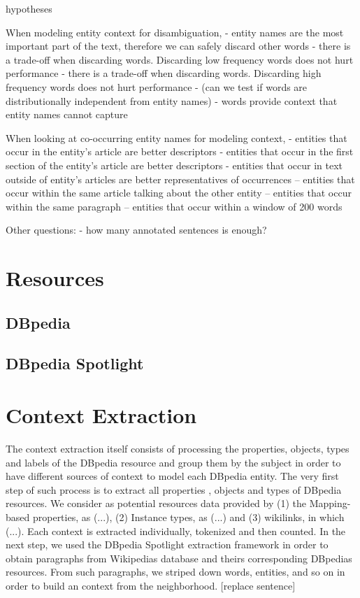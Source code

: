 \documentclass[10pt,a4paper]{article}
\begin{document}
hypotheses

When modeling entity context for disambiguation,
- entity names are the most important part of the text, therefore we can safely discard other words 
- there is a trade-off when discarding words. Discarding low frequency words does not hurt performance
- there is a trade-off when discarding words. Discarding high frequency words does not hurt performance
- (can we test if words are distributionally independent from entity names)
- words provide context that entity names cannot capture

When looking at co-occurring entity names for modeling context,
- entities that occur in the entity's article are better descriptors
- entities that occur in the first section of the entity's article are better descriptors
- entities that occur in text outside of entity's articles are better representatives of occurrences
-- entities that occur within the same article talking about the other entity
-- entities that occur within the same paragraph
-- entities that occur within a window of 200 words

Other questions:
- how many annotated sentences is enough?

\section{Resources}
\subsection{DBpedia}
\subsection{DBpedia Spotlight}
\section{Context Extraction}
The context extraction itself consists of processing the properties, objects, types and labels of the DBpedia resource and group them by the subject in order to have  different sources of context to model each DBpedia entity.
The very first step of such process is to extract all properties , objects and types of DBpedia resources. We consider as potential resources data provided by (1) the Mapping-based properties, as (...), (2) Instance types, as (...) and (3) wikilinks, in which (...). Each context is extracted individually, tokenized and then counted. In the next step, we used the DBpedia Spotlight extraction framework in order to obtain paragraphs from Wikipedias database and theirs corresponding DBpedias resources. From such paragraphs, we striped down words, entities, and so on in order to build an context from the neighborhood. [replace sentence]
\end{document}
